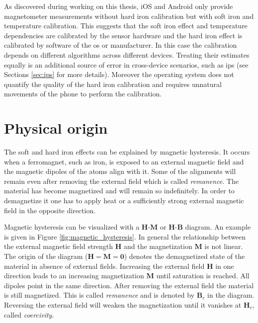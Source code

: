 As discovered during working on this thesis, iOS and Android only provide magnetometer measurements without hard iron calibration but with soft iron and temperature calibration. This suggests that the soft iron effect and temperature dependencies are calibrated by the sensor hardware and the hard iron effect is calibrated by software of the \gls{os} or manufacturer. In this case the calibration depends on different algorithms across different devices. Treating their estimates equally is an additional source of error in cross-device scenarios, such as \gls{ips} (see Sections \ref{sec:ips} for more details). Moreover the operating system does not quantify the quality of the hard iron calibration and requires unnatural movements of the phone to perform the calibration.

\section{Physical origin}

The soft and hard iron effects can be explained by magnetic hysteresis. It occurs when a ferromagnet, such as iron, is exposed to an external magnetic field and the magnetic dipoles of the atoms align with it. Some of the alignments will remain even after removing the external field which is called \textit{remanence}. The material has become magnetized and will remain so indefinitely. In order to demagnetize it one has to apply heat or a sufficiently strong external magnetic field in the opposite direction.\cite{demtroeder_hysteresis}

Magnetic hysteresis can be visualized with a $\bm{H}$-$\bm{M}$ or $\bm{H}$-$\bm{B}$ diagram. An example is given in Figure \ref{fig:magnetic_hysteresis}. In general the relationship between the external magnetic field strength $\bm{H}$ and the magnetization $\bm{M}$ is not linear. The origin of the diagram ($\bm{H}=\bm{M}=\bm{0}$) denotes the demagnetized state of the material in absence of external fields. Increasing the external field $\bm{H}$ in one direction leads to an increasing magnetization $\bm{M}$ until saturation is reached. All dipoles point in the same direction. After removing the external field the material is still magnetized. This is called \textit{remanence} and is denoted by $\bm{B}_r$ in the diagram. Reversing the external field will weaken the magnetization until it vanishes at $\bm{H}_c$, called \textit{coercivity}.

